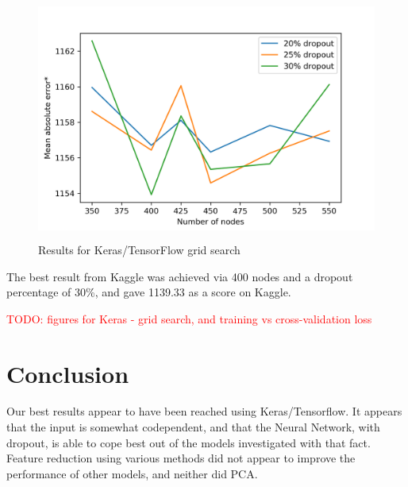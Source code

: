 \documentclass[a4paper]{article}
\newcommand\todo[1]{\textcolor{red}{TODO: #1}}
\begin{document}
\begin{figure}[H]
	\centering
	\includegraphics[width=15cm,height=8cm,keepaspectratio]{Images/keras-search.png}
	\caption{Results for Keras/TensorFlow grid search}
	\label{fig:keras-search}
\end{figure}

The best result from Kaggle was achieved via 400 nodes and a dropout percentage of 30\%, and gave 1139.33 as a score on Kaggle.

\todo{figures for Keras - grid search, and training vs cross-validation loss}




\section{Conclusion}

Our best results appear to have been reached using Keras/Tensorflow.  It appears that the input is somewhat codependent, and that the Neural Network, with dropout, is able to cope best out of the models investigated with that fact.  Feature reduction using various methods did not appear to improve the performance of other models, and neither did PCA.  
\end{document}
